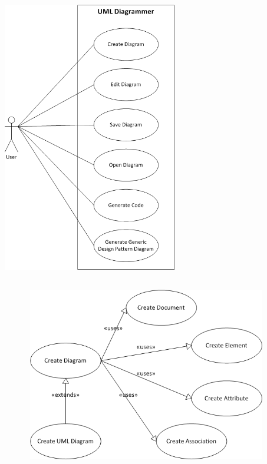 \documentclass[a4paper, 12pt]{article}
\begin{document}
\begin{center}
  \includegraphics[height=5in,width=3in]{img/SystemOverview.png}
\end{center}

\begin {center}
  \includegraphics[height=3in, width=5in]{img/CreateDiagram.png}
\end{center}
\end{document}
